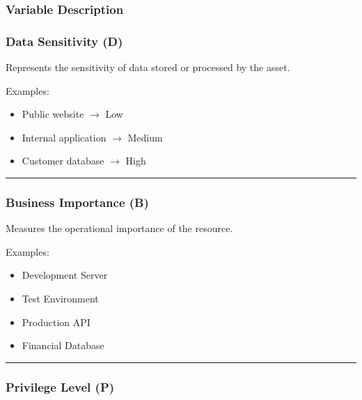\subsubsection{Variable Description}

\subsubsection{\texorpdfstring{\textbf{Data Sensitivity (D)}}{Data Sensitivity (D)}}

Represents the sensitivity of data stored or processed by the asset.

Examples:

\begin{itemize}
\tightlist
\item
  Public website \(\rightarrow\) Low\\
\item
  Internal application \(\rightarrow\) Medium\\
\item
  Customer database \(\rightarrow\) High
\end{itemize}

\begin{center}\rule{0.5\linewidth}{0.5pt}\end{center}

\subsubsection{\texorpdfstring{\textbf{Business Importance (B)}}{Business Importance (B)}}

Measures the operational importance of the resource.

Examples:

\begin{itemize}
\tightlist
\item
  Development Server\\
\item
  Test Environment\\
\item
  Production API\\
\item
  Financial Database
\end{itemize}

\begin{center}\rule{0.5\linewidth}{0.5pt}\end{center}

\subsubsection{\texorpdfstring{\textbf{Privilege Level (P)}}{Privilege Level (P)}}

